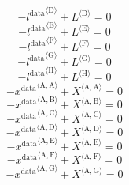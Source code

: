 \begin{equation}
-{l^{\mathrm{data}}}^{\langle \mathrm{\mathrm{D}}\rangle} + {L}^{\langle \mathrm{D}\rangle} = 0
\end{equation}
\begin{equation}
-{l^{\mathrm{data}}}^{\langle \mathrm{\mathrm{E}}\rangle} + {L}^{\langle \mathrm{E}\rangle} = 0
\end{equation}
\begin{equation}
-{l^{\mathrm{data}}}^{\langle \mathrm{\mathrm{F}}\rangle} + {L}^{\langle \mathrm{F}\rangle} = 0
\end{equation}
\begin{equation}
-{l^{\mathrm{data}}}^{\langle \mathrm{\mathrm{G}}\rangle} + {L}^{\langle \mathrm{G}\rangle} = 0
\end{equation}
\begin{equation}
-{l^{\mathrm{data}}}^{\langle \mathrm{\mathrm{H}}\rangle} + {L}^{\langle \mathrm{H}\rangle} = 0
\end{equation}
\begin{equation}
-{x^{\mathrm{data}}}^{\langle \mathrm{\mathrm{A}},\mathrm{\mathrm{A}}\rangle} + {X}^{\langle \mathrm{A},\mathrm{A}\rangle} = 0
\end{equation}
\begin{equation}
-{x^{\mathrm{data}}}^{\langle \mathrm{\mathrm{A}},\mathrm{\mathrm{B}}\rangle} + {X}^{\langle \mathrm{A},\mathrm{B}\rangle} = 0
\end{equation}
\begin{equation}
-{x^{\mathrm{data}}}^{\langle \mathrm{\mathrm{A}},\mathrm{\mathrm{C}}\rangle} + {X}^{\langle \mathrm{A},\mathrm{C}\rangle} = 0
\end{equation}
\begin{equation}
-{x^{\mathrm{data}}}^{\langle \mathrm{\mathrm{A}},\mathrm{\mathrm{D}}\rangle} + {X}^{\langle \mathrm{A},\mathrm{D}\rangle} = 0
\end{equation}
\begin{equation}
-{x^{\mathrm{data}}}^{\langle \mathrm{\mathrm{A}},\mathrm{\mathrm{E}}\rangle} + {X}^{\langle \mathrm{A},\mathrm{E}\rangle} = 0
\end{equation}
\begin{equation}
-{x^{\mathrm{data}}}^{\langle \mathrm{\mathrm{A}},\mathrm{\mathrm{F}}\rangle} + {X}^{\langle \mathrm{A},\mathrm{F}\rangle} = 0
\end{equation}
\begin{equation}
-{x^{\mathrm{data}}}^{\langle \mathrm{\mathrm{A}},\mathrm{\mathrm{G}}\rangle} + {X}^{\langle \mathrm{A},\mathrm{G}\rangle} = 0
\end{equation}
